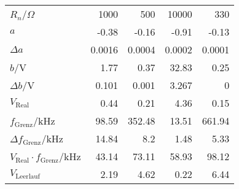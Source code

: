 \begin{tabular}{lrrrr}
\hline
 $R_n$/$\Omega$                           & 1000      & 500      & 10000      & 330      \\
 $a$                                      &   -0.38   &  -0.16   &    -0.91   &  -0.13   \\
 $\Delta a$                               &    0.0016 &   0.0004 &     0.0002 &   0.0001 \\
 $b$/V                                    &    1.77   &   0.37   &    32.83   &   0.25   \\
 $\Delta b$/V                             &    0.101  &   0.001  &     3.267  &   0      \\
 $V_\text{Real}$                          &    0.44   &   0.21   &     4.36   &   0.15   \\
 $f_\text{Grenz}$/kHz                     &   98.59   & 352.48   &    13.51   & 661.94   \\
 $\Delta f_\text{Grenz}$/kHz              &   14.84   &   8.2    &     1.48   &   5.33   \\
 $V_\text{Real} \cdot f_\text{Grenz}$/kHz &   43.14   &  73.11   &    58.93   &  98.12   \\
 $V_\text{Leerlauf}$                      &    2.19   &   4.62   &     0.22   &   6.44   \\
\hline
\end{tabular}